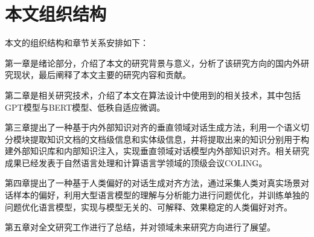 \section{本文组织结构}

本文的组织结构和章节关系安排如下：

第一章是绪论部分，介绍了本文的研究背景与意义，分析了该研究方向的国内外研究现状，最后阐释了本文主要的研究内容和贡献。

第二章是相关研究技术，介绍了本文在算法设计中使用到的相关技术，其中包括GPT模型与BERT模型、低秩自适应微调。

第三章提出了一种基于内外部知识对齐的垂直领域对话生成方法，利用一个语义切分模块提取知识文档的文档级信息和实体级信息，并将提取出来的知识分别用于构建外部知识库和内部知识注入，实现垂直领域对话模型内外部知识对齐。相关研究成果已经发表于自然语言处理和计算语言学领域的顶级会议COLING。

第四章提出了一种基于人类偏好的对话生成对齐方法，通过采集人类对真实场景对话样本的偏好，利用大型语言模型的理解与分析能力进行问题优化，并训练单独的问题优化语言模型，实现与模型无关的、可解释、效果稳定的人类偏好对齐。

第五章对全文研究工作进行了总结，并对领域未来研究方向进行了展望。
